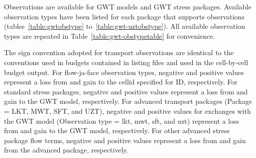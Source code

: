 Observations are available for GWT models and GWT stress packages. Available observation types have been listed for each package that supports observations (tables~\ref{table:gwtobstype} to~\ref{table:gwt-uztobstype}). All available observation types are repeated in Table~\ref{table:gwt-obstypetable} for convenience. 

The sign convention adopted for transport observations are identical to the conventions used in budgets contained in listing files and used in the cell-by-cell budget output. For flow-ja-face observation types, negative and positive values represent a loss from and gain to the cellid specified for ID, respectively. For standard stress packages, negative and positive values represent a loss from and gain to the GWT model, respectively. For advanced transport packages (Package = LKT, MWT, SFT, and UZT), negative and positive values for exchanges with the GWT model (Observation type = lkt, mwt, sft, and uzt) represent a loss from and gain to the GWT model, respectively. For other advanced stress package flow terms, negative and positive values represent a loss from and gain from the advanced package, respectively.

\FloatBarrier

\FloatBarrier
